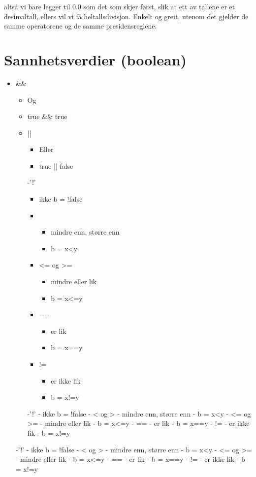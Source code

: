 \documentclass[11pt]{article}
\begin{document}
   altså vi bare legger til 0.0 som det som skjer først, slik at ett av tallene er
   et desimaltall, ellers vil vi få heltallsdivisjon. Enkelt og greit,
   utenom det gjelder de samme operatorene og de samme presidensreglene.
\section{Sannhetsverdier (boolean)}
\label{sec-2}


\begin{itemize}
\item \&\&
\begin{itemize}
\item Og
\item true \&\& true
\item ||
\begin{itemize}
\item Eller
\item true || false
\end{itemize}
-'!'
\begin{itemize}
\item ikke
       b = !false
\item < og >
\begin{itemize}
\item mindre enn, større enn
\item b = x<y
\end{itemize}
\item <= og >=
\begin{itemize}
\item mindre eller lik
\item b = x<=y
\end{itemize}
\item ==
\begin{itemize}
\item er lik
\item b = x==y
\end{itemize}
\item !=
\begin{itemize}
\item er ikke lik
\item b = x!=y
\end{itemize}
\end{itemize}
-'!'
     - ikke
       b = !false
   - < og > 
     - mindre enn, større enn
     - b = x<y
   - <= og >= 
     - mindre eller lik       
     - b = x<=y
   - ==       
     - er lik
     - b = x==y
   - !=
     - er ikke lik
     - b = x!=y
\end{itemize}
-'!'
     - ikke
       b = !false
   - < og > 
     - mindre enn, større enn
     - b = x<y
   - <= og >= 
     - mindre eller lik       
     - b = x<=y
   - ==       
     - er lik
     - b = x==y
   - !=
     - er ikke lik
     - b = x!=y
\end{itemize}
\end{document}
